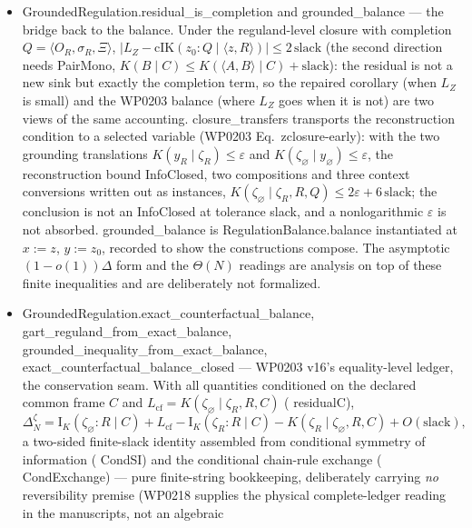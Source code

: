 \documentclass[11pt,a4paper]{article}
\newcommand{\lean}[1]{{\ttfamily\small
  \let\leanunderscore\_\def\_{\leanunderscore\allowbreak}#1}}
\newcommand{\Ik}{\mathrm{I}_K}
\begin{document}
\begin{itemize}[leftmargin=1.4em,itemsep=1pt]
conditioning monotonicity. Closure is therefore automatic in abstract ART and becomes a
substantive hypothesis only for physically bounded realizations; localization and
minimality retain the substantive bookkeeping role.
\item \lean{GroundedRegulation.residual\_is\_completion} and \lean{grounded\_balance} ---
the bridge back to the balance. Under the reguland-level closure with completion
$Q=\langle O_R,\sigma_R,\Xi\rangle$,
$|L_Z-\mathrm{cIK}(z_0{:}Q\mid\langle z,R\rangle)|\le 2\,\mathrm{slack}$ (the second
direction needs \lean{PairMono}, $K(B\mid C)\le K(\langle A,B\rangle\mid C)+\mathrm{slack}$):
the residual is not a new sink but exactly the completion term, so the repaired corollary
(when $L_Z$ is small) and the WP0203 balance (where $L_Z$ goes when it is not) are two views
of the same accounting. \lean{closure\_transfers} transports the reconstruction condition to
a selected variable (WP0203 Eq.~zclosure-early): with the two grounding translations
$K(y_R\mid\zeta_R)\le\varepsilon$ and $K(\zeta_\varnothing\mid y_\varnothing)\le\varepsilon$,
the reconstruction bound \lean{InfoClosed}, two compositions and three context conversions
written out as instances, $K(\zeta_\varnothing\mid\zeta_R,R,Q)\le2\varepsilon+6\,\mathrm{slack}$;
the conclusion is not an \lean{InfoClosed} at tolerance slack, and a nonlogarithmic
$\varepsilon$ is not absorbed. \lean{grounded\_balance} is \lean{RegulationBalance.balance}
instantiated at $x:=z$, $y:=z_0$, recorded to show the constructions compose. The
asymptotic $(1-o(1))\Delta$ form and the $\Theta(N)$ readings are analysis on top of these
finite inequalities and are deliberately not formalized.
\item \lean{GroundedRegulation.exact\_counterfactual\_balance},
\lean{gart\_reguland\_from\_exact\_balance},
\lean{grounded\_inequality\_from\_exact\_balance},
\lean{exact\_counterfactual\_balance\_closed} --- WP0203 v16's equality-level ledger, the
conservation seam. With all quantities conditioned on the declared common frame $C$ and
$L_{\mathrm{cf}}=K(\zeta_\varnothing\mid\zeta_R,R,C)$ (\lean{residualC}),
\[
  \Delta_N^\zeta=\Ik(\zeta_\varnothing{:}R\mid C)+L_{\mathrm{cf}}
    -\Ik(\zeta_R{:}R\mid C)-K(\zeta_R\mid\zeta_\varnothing,R,C)+O(\mathrm{slack}),
\]
a two-sided finite-slack identity assembled from conditional symmetry of information
(\lean{CondSI}) and the conditional chain-rule exchange (\lean{CondExchange}) --- pure
finite-string bookkeeping, deliberately carrying \emph{no} reversibility premise (WP0218
supplies the physical complete-ledger reading in the manuscripts, not an algebraic

\end{itemize}
\end{document}
